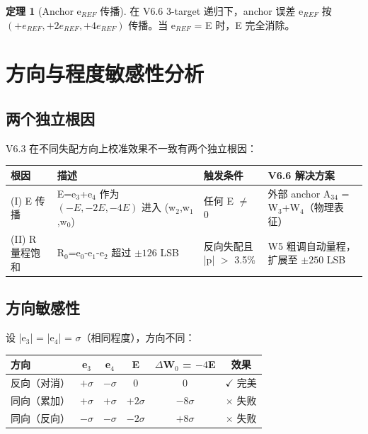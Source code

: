 \documentclass[UTF8,a4paper,12pt]{ctexart}
\theoremstyle{definition}
\newtheorem{theorem}{定理}[section]
\begin{document}
\begin{theorem}[Anchor e$_{REF}$ 传播]
在 V6.6 3-target 递归下，anchor 误差 e$_{REF}$ 按
$(+e_{REF}, +2e_{REF}, +4e_{REF})$ 传播。当 e$_{REF}$ = E 时，E 完全消除。
\end{theorem}

\section{方向与程度敏感性分析}

\subsection{两个独立根因}

V6.3 在不同失配方向上校准效果不一致有两个独立根因：

\begin{longtable}{p{2.5cm}p{4cm}p{3.5cm}p{4cm}}
\toprule
\textbf{根因} & \textbf{描述} & \textbf{触发条件} & \textbf{V6.6 解决方案} \\
\midrule
\endhead
\bottomrule
\endfoot
(I) E 传播 & E=e$_3$+e$_4$ 作为 $(-E,-2E,-4E)$ 进入 (w$_2$,w$_1$,w$_0$) & 任何 E $\neq$ 0 & 外部 anchor A$_{34}$ = W$_3$+W$_4$（物理表征）\\
(II) R 量程饱和 & R$_0$=e$_0$-e$_1$-e$_2$ 超过 $\pm 126$ LSB & 反向失配且 |p| $>$ 3.5\% & W5 粗调自动量程，扩展至 $\pm 250$ LSB \\
\bottomrule
\end{longtable}

\subsection{方向敏感性}

设 |e$_3$| = |e$_4$| = $\sigma$（相同程度），方向不同：

\begin{longtable}{lccccc}
\toprule
\textbf{方向} & \textbf{e$_3$} & \textbf{e$_4$} & \textbf{E} & $\Delta$W$_0$ = $-4$E & \textbf{效果} \\
\midrule
\endhead
\bottomrule
\endfoot
反向（对消） & $+\sigma$ & $-\sigma$ & 0 & 0 & $\checkmark$ 完美 \\
同向（累加） & $+\sigma$ & $+\sigma$ & $+2\sigma$ & $-8\sigma$ & $\times$ 失败 \\
同向（反向） & $-\sigma$ & $-\sigma$ & $-2\sigma$ & $+8\sigma$ & $\times$ 失败 \\
\bottomrule
\end{longtable}
\end{document}

